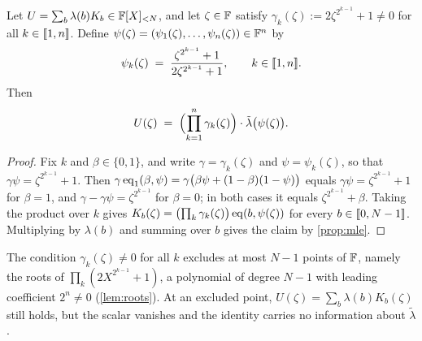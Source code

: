 \begin{proposition}\label{prop:eval}
Let $U = \sum_{b} \lambda(b) K_b \in \mathbb{F}[X]_{<N}$, and let $\zeta \in \mathbb{F}$ satisfy $\gamma_k(\zeta) := 2\zeta^{2^{k-1}} + 1 \ne 0$ for all $k \in \llbracket 1, n \rrbracket$. Define $\psi(\zeta) = (\psi_1(\zeta),\dots,\psi_n(\zeta)) \in \mathbb{F}^n$ by
\[
  \psi_k(\zeta) \;=\; \frac{\zeta^{2^{k-1}} + 1}{2\zeta^{2^{k-1}} + 1}, \qquad k \in \llbracket 1, n \rrbracket.
\]
Then
\[
  U(\zeta) \;=\; \Bigl( \prod_{k=1}^{n} \gamma_k(\zeta) \Bigr) \cdot \tilde\lambda\bigl(\psi(\zeta)\bigr).
\]
\end{proposition}

\begin{proof}
Fix $k$ and $\beta \in \{0,1\}$, and write $\gamma = \gamma_k(\zeta)$ and $\psi = \psi_k(\zeta)$, so that $\gamma \psi = \zeta^{2^{k-1}} + 1$.
Then $\gamma\, \mathrm{eq}_1(\beta, \psi) = \gamma\bigl(\beta \psi + (1-\beta)(1-\psi)\bigr)$ equals $\gamma \psi = \zeta^{2^{k-1}} + 1$ for $\beta = 1$, and $\gamma - \gamma \psi = \zeta^{2^{k-1}}$ for $\beta = 0$; in both cases it equals $\zeta^{2^{k-1}} + \beta$.
Taking the product over $k$ gives $K_b(\zeta) = \bigl(\prod_k \gamma_k(\zeta)\bigr)\, \mathrm{eq}(b, \psi(\zeta))$ for every $b \in \llbracket 0, N-1 \rrbracket$.
Multiplying by $\lambda(b)$ and summing over $b$ gives the claim by \cref{prop:mle}.
\end{proof}

\begin{remark}\label{rem:eval-degenerate}
The condition $\gamma_k(\zeta) \ne 0$ for all $k$ excludes at most $N-1$ points of $\mathbb{F}$, namely the roots of $\prod_k (2X^{2^{k-1}} + 1)$, a polynomial of degree $N-1$ with leading coefficient $2^n \ne 0$ (\cref{lem:roots}).
At an excluded point, $U(\zeta) = \sum_b \lambda(b) K_b(\zeta)$ still holds, but the scalar vanishes and the identity carries no information about $\tilde\lambda$.
\end{remark}
